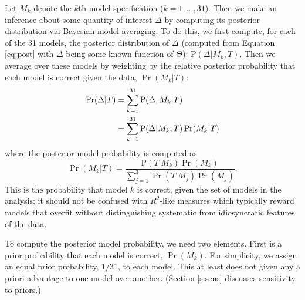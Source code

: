 \documentclass[11pt,titlepage]{article}
\renewcommand{\P}{\text{P}}
\begin{document}
Let $M_k$ denote the $k$th model specification ($k=1,\dots,31$). Then
we make an inference about some quantity of interest $\Delta$ by
computing its posterior distribution via Bayesian model averaging.  To
do this, we first compute, for each of the 31 models, the posterior
distribution of $\Delta$ (computed from Equation \ref{eq:post} with
$\Delta$ being some known function of $\Theta$): $\P(\Delta|M_k,T)$.
Then we average over these models by weighting by the relative
posterior probability that each model is correct given the data,
$\Pr(M_k|T)$:
\begin{align} \label{eq:bma}
  \Pr(\Delta|T) &= \sum_{k=1}^{31} \P(\Delta,M_k|T)\notag\\
                &= \sum_{k=1}^{31} \P(\Delta|M_k,T) \Pr(M_k|T)
\end{align}
where the posterior model probability is computed as
\begin{equation}
  \Pr(M_k|T)=\frac{\P(T|M_k)\Pr(M_k)}
             {\sum_{j=1}^{31} \Pr(T|M_j) \Pr(M_j)}.  \label{eq:postmodel}
\end{equation}
This is the probability that model $k$ is correct, given the set of
models in the analysis; it should not be confused with $R^2$-like
measures which typically reward models that overfit without
distinguishing systematic from idiosyncratic features of the data.

To compute the posterior model probability, we need two elements.
First is a prior probability that each model is correct, $\Pr(M_k)$.
For simplicity, we assign an equal prior probability, $1/31$, to each
model.  This at least does not given any a priori advantage to one
model over another.  (Section \ref{s:sens} discusses sensitivity to
priors.)
\end{document}

